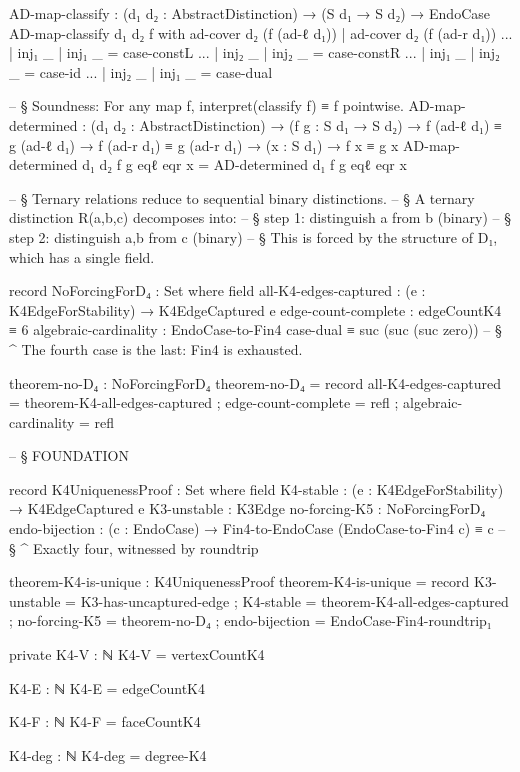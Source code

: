 \documentclass[11pt,a4paper]{book}
\begin{document}
\begin{code}
AD-map-classify : (d₁ d₂ : AbstractDistinction) → (S d₁ → S d₂) → EndoCase
AD-map-classify d₁ d₂ f with ad-cover d₂ (f (ad-ℓ d₁)) | ad-cover d₂ (f (ad-r d₁))
... | inj₁ _ | inj₁ _ = case-constL
... | inj₂ _ | inj₂ _ = case-constR
... | inj₁ _ | inj₂ _ = case-id
... | inj₂ _ | inj₁ _ = case-dual

-- § Soundness: For any map f, interpret(classify f) ≡ f pointwise.
AD-map-determined : (d₁ d₂ : AbstractDistinction) →
                    (f g : S d₁ → S d₂) →
                    f (ad-ℓ d₁) ≡ g (ad-ℓ d₁) →
                    f (ad-r d₁) ≡ g (ad-r d₁) →
                    (x : S d₁) → f x ≡ g x
AD-map-determined d₁ d₂ f g eqℓ eqr x = AD-determined d₁ f g eqℓ eqr x

-- § Ternary relations reduce to sequential binary distinctions.
-- § A ternary distinction R(a,b,c) decomposes into:
-- § step 1: distinguish a from b  (binary)
-- § step 2: distinguish {a,b} from c  (binary)
-- § This is forced by the structure of D₁, which has a single field.

record NoForcingForD₄ : Set where
  field
    all-K4-edges-captured : (e : K4EdgeForStability) → K4EdgeCaptured e
    edge-count-complete : edgeCountK4 ≡ 6
    algebraic-cardinality : EndoCase-to-Fin4 case-dual ≡ suc (suc (suc zero))
    -- § ^ The fourth case is the last: Fin4 is exhausted.

theorem-no-D₄ : NoForcingForD₄
theorem-no-D₄ = record
  { all-K4-edges-captured = theorem-K4-all-edges-captured
  ; edge-count-complete = refl
  ; algebraic-cardinality = refl
  }


-- § FOUNDATION

record K4UniquenessProof : Set where
  field
    K4-stable     : (e : K4EdgeForStability) → K4EdgeCaptured e
    K3-unstable   : K3Edge
    no-forcing-K5 : NoForcingForD₄
    endo-bijection : (c : EndoCase) → Fin4-to-EndoCase (EndoCase-to-Fin4 c) ≡ c
    -- § ^ Exactly four, witnessed by roundtrip

theorem-K4-is-unique : K4UniquenessProof
theorem-K4-is-unique = record
  { K3-unstable = K3-has-uncaptured-edge
  ; K4-stable = theorem-K4-all-edges-captured
  ; no-forcing-K5 = theorem-no-D₄
  ; endo-bijection = EndoCase-Fin4-roundtrip₁
  }

private
  K4-V : ℕ
  K4-V = vertexCountK4

  K4-E : ℕ
  K4-E = edgeCountK4

  K4-F : ℕ
  K4-F = faceCountK4

  K4-deg : ℕ
  K4-deg = degree-K4


\end{code}
\end{document}
